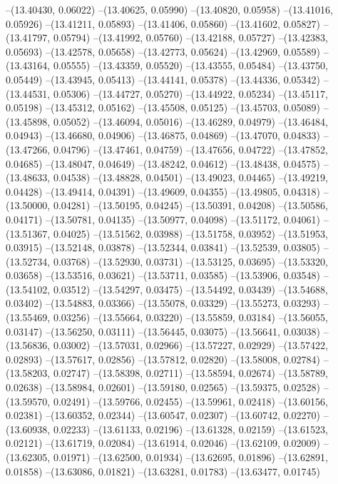 --(13.40430, 0.06022)
--(13.40625, 0.05990)
--(13.40820, 0.05958)
--(13.41016, 0.05926)
--(13.41211, 0.05893)
--(13.41406, 0.05860)
--(13.41602, 0.05827)
--(13.41797, 0.05794)
--(13.41992, 0.05760)
--(13.42188, 0.05727)
--(13.42383, 0.05693)
--(13.42578, 0.05658)
--(13.42773, 0.05624)
--(13.42969, 0.05589)
--(13.43164, 0.05555)
--(13.43359, 0.05520)
--(13.43555, 0.05484)
--(13.43750, 0.05449)
--(13.43945, 0.05413)
--(13.44141, 0.05378)
--(13.44336, 0.05342)
--(13.44531, 0.05306)
--(13.44727, 0.05270)
--(13.44922, 0.05234)
--(13.45117, 0.05198)
--(13.45312, 0.05162)
--(13.45508, 0.05125)
--(13.45703, 0.05089)
--(13.45898, 0.05052)
--(13.46094, 0.05016)
--(13.46289, 0.04979)
--(13.46484, 0.04943)
--(13.46680, 0.04906)
--(13.46875, 0.04869)
--(13.47070, 0.04833)
--(13.47266, 0.04796)
--(13.47461, 0.04759)
--(13.47656, 0.04722)
--(13.47852, 0.04685)
--(13.48047, 0.04649)
--(13.48242, 0.04612)
--(13.48438, 0.04575)
--(13.48633, 0.04538)
--(13.48828, 0.04501)
--(13.49023, 0.04465)
--(13.49219, 0.04428)
--(13.49414, 0.04391)
--(13.49609, 0.04355)
--(13.49805, 0.04318)
--(13.50000, 0.04281)
--(13.50195, 0.04245)
--(13.50391, 0.04208)
--(13.50586, 0.04171)
--(13.50781, 0.04135)
--(13.50977, 0.04098)
--(13.51172, 0.04061)
--(13.51367, 0.04025)
--(13.51562, 0.03988)
--(13.51758, 0.03952)
--(13.51953, 0.03915)
--(13.52148, 0.03878)
--(13.52344, 0.03841)
--(13.52539, 0.03805)
--(13.52734, 0.03768)
--(13.52930, 0.03731)
--(13.53125, 0.03695)
--(13.53320, 0.03658)
--(13.53516, 0.03621)
--(13.53711, 0.03585)
--(13.53906, 0.03548)
--(13.54102, 0.03512)
--(13.54297, 0.03475)
--(13.54492, 0.03439)
--(13.54688, 0.03402)
--(13.54883, 0.03366)
--(13.55078, 0.03329)
--(13.55273, 0.03293)
--(13.55469, 0.03256)
--(13.55664, 0.03220)
--(13.55859, 0.03184)
--(13.56055, 0.03147)
--(13.56250, 0.03111)
--(13.56445, 0.03075)
--(13.56641, 0.03038)
--(13.56836, 0.03002)
--(13.57031, 0.02966)
--(13.57227, 0.02929)
--(13.57422, 0.02893)
--(13.57617, 0.02856)
--(13.57812, 0.02820)
--(13.58008, 0.02784)
--(13.58203, 0.02747)
--(13.58398, 0.02711)
--(13.58594, 0.02674)
--(13.58789, 0.02638)
--(13.58984, 0.02601)
--(13.59180, 0.02565)
--(13.59375, 0.02528)
--(13.59570, 0.02491)
--(13.59766, 0.02455)
--(13.59961, 0.02418)
--(13.60156, 0.02381)
--(13.60352, 0.02344)
--(13.60547, 0.02307)
--(13.60742, 0.02270)
--(13.60938, 0.02233)
--(13.61133, 0.02196)
--(13.61328, 0.02159)
--(13.61523, 0.02121)
--(13.61719, 0.02084)
--(13.61914, 0.02046)
--(13.62109, 0.02009)
--(13.62305, 0.01971)
--(13.62500, 0.01934)
--(13.62695, 0.01896)
--(13.62891, 0.01858)
--(13.63086, 0.01821)
--(13.63281, 0.01783)
--(13.63477, 0.01745)
